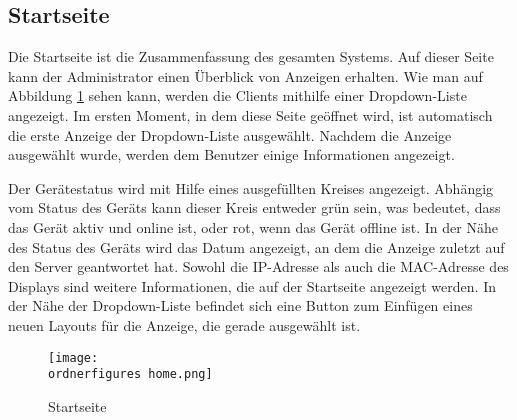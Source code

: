 

\subsection{Startseite}

Die Startseite ist die Zusammenfassung des gesamten Systems. Auf dieser Seite kann der Administrator einen Überblick von Anzeigen erhalten. Wie man auf Abbildung \ref{fi:home} sehen kann, werden die Clients mithilfe einer Dropdown-Liste angezeigt. Im ersten Moment, in dem diese Seite geöffnet wird, ist automatisch die erste Anzeige der Dropdown-Liste ausgewählt. Nachdem die Anzeige ausgewählt wurde, werden dem Benutzer einige Informationen angezeigt.

Der Gerätestatus wird mit Hilfe eines ausgefüllten Kreises angezeigt. Abhängig vom Status des Geräts kann dieser Kreis entweder grün sein, was bedeutet, dass das Gerät aktiv und online ist, oder rot, wenn das Gerät offline ist. In der Nähe des Status des Geräts wird das Datum angezeigt, an dem die Anzeige zuletzt auf den Server geantwortet hat.
Sowohl die IP-Adresse als auch die MAC-Adresse des Displays sind weitere Informationen, die auf der Startseite angezeigt werden.
In der Nähe der Dropdown-Liste befindet sich eine Button zum Einfügen eines neuen Layouts für die Anzeige, die gerade ausgewählt ist.


\begin{figure}[H]
	\centering
	\texttt{[image: \\ordnerfigures home.png]}
	\caption{Startseite}
	\label{fi:home}
\end{figure}


